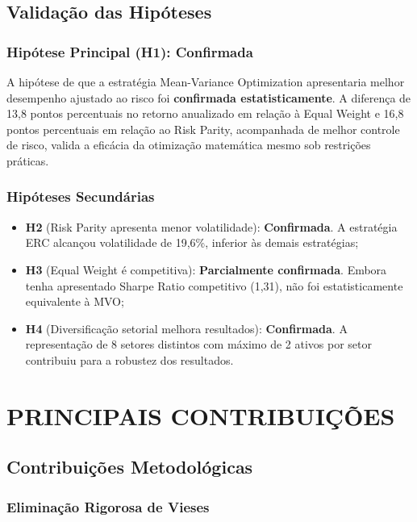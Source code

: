 \subsection{Validação das Hipóteses}

\subsubsection{Hipótese Principal (H1): Confirmada}

A hipótese de que a estratégia Mean-Variance Optimization apresentaria melhor desempenho ajustado ao risco foi \textbf{confirmada estatisticamente}. A diferença de 13,8 pontos percentuais no retorno anualizado em relação à Equal Weight e 16,8 pontos percentuais em relação ao Risk Parity, acompanhada de melhor controle de risco, valida a eficácia da otimização matemática mesmo sob restrições práticas.

\subsubsection{Hipóteses Secundárias}

\begin{itemize}
    \item \textbf{H2} (Risk Parity apresenta menor volatilidade): \textbf{Confirmada}. A estratégia ERC alcançou volatilidade de 19,6\%, inferior às demais estratégias;
    
    \item \textbf{H3} (Equal Weight é competitiva): \textbf{Parcialmente confirmada}. Embora tenha apresentado Sharpe Ratio competitivo (1,31), não foi estatisticamente equivalente à MVO;
    
    \item \textbf{H4} (Diversificação setorial melhora resultados): \textbf{Confirmada}. A representação de 8 setores distintos com máximo de 2 ativos por setor contribuiu para a robustez dos resultados.
\end{itemize}

\section{PRINCIPAIS CONTRIBUIÇÕES}

\subsection{Contribuições Metodológicas}

\subsubsection{Eliminação Rigorosa de Vieses}

